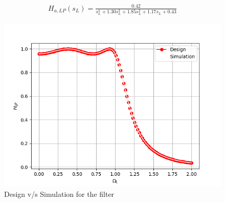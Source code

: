 \documentclass[journal,12pt,twocolumn]{IEEEtran}
\theoremstyle{remark}
\begin{document}
\begin{enumerate}
\begin{footnotesize}
\begin{align}
    H_{a,LP}(s_L) = \frac{0.42}{s_{L}^4 + 1.30s_{L}^3 +1.85s_{L}^2 + 1.17s_{L} +0.43}\label{eq:design}
\end{align}
\end{footnotesize}
\begin{figure}
    \centering
    \includegraphics[width = \columnwidth]{figs/Design vs Simulation.png}
    \caption{Design v/s Simulation for the filter}
    \label{fig:desVsim}
\end{figure}


\end{enumerate}
\end{document}
